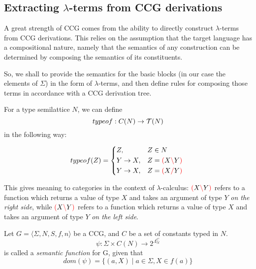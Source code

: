 \documentclass[main.tex]{subfiles}
\begin{document}
\subsection{Extracting $\lambda$-terms from CCG derivations}

A great strength of CCG comes from the ability to directly construct $\lambda$-terms
from CCG derivations. This relies on the assumption that the target
language has a compositional nature, namely that the semantics of any construction
can be determined by composing the semantics of its constituents.

So, we shall to provide the semantics for the basic blocks (in our case
the elements of $\Sigma$) in the form of $\lambda$-terms, and then define rules
for composing those terms in accordance with a CCG derivation tree.

\begin{defn}
    For a type semilattice $N$, we can define
    \[ typeof : C(N) \rightarrow \mathcal{T}( N ) \]
    in the following way:

    \[
        typeof(Z) =
        \begin{cases*}
            Z, & $Z \in N$ \\
            Y \tot X, & $Z = \lp X \lc Y \rp$ \\
            Y \tot X, & $Z = \lp X \rc Y \rp$ \\
        \end{cases*}
    \]

    This gives meaning to categories in the context of $\lambda$-calculus:
    $\textcolor{red}{(} X \textcolor{red}{\backslash} Y \textcolor{red}{)}$ refers to a function which returns a value of type
    $X$ and takes an argument of type $Y$ \emph{on the right side}, while
    $\textcolor{red}{(} X \textcolor{red}{\backslash} Y \textcolor{red}{)}$ refers to a function which returns a value of type
    $X$ and takes an argument of type $Y$ \emph{on the left side}.
\end{defn}

\begin{defn}
    Let $ G = \langle \Sigma, N, S, f, n \rangle $ be a CCG, and $C$ be a set
    of constants typed in $N$.
    \[ \psi : \Sigma \times C(N) \rightarrow 2^{\Lambda_N^C} \] is called a
    \emph{semantic function} for G, given that
    \[ dom(\psi) = \{ (a, X) \mid a \in \Sigma, X \in f(a) \} \]
\end{defn}
\end{document}
